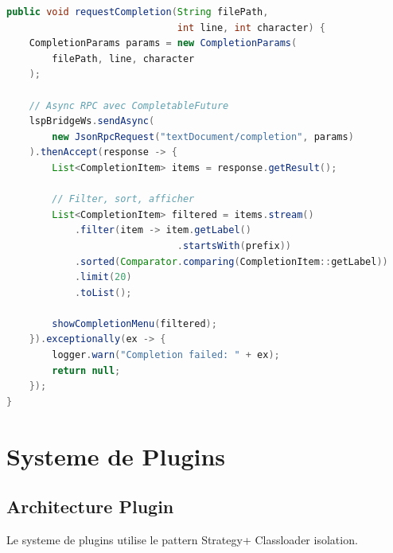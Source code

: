 \documentclass[11pt,a4paper,hidelinks]{book}
\begin{document}
\begin{lstlisting}[language=Java, caption={Completion Handler}]
public void requestCompletion(String filePath, 
                              int line, int character) {
    CompletionParams params = new CompletionParams(
        filePath, line, character
    );
    
    // Async RPC avec CompletableFuture
    lspBridgeWs.sendAsync(
        new JsonRpcRequest("textDocument/completion", params)
    ).thenAccept(response -> {
        List<CompletionItem> items = response.getResult();
        
        // Filter, sort, afficher
        List<CompletionItem> filtered = items.stream()
            .filter(item -> item.getLabel()
                              .startsWith(prefix))
            .sorted(Comparator.comparing(CompletionItem::getLabel))
            .limit(20)
            .toList();
        
        showCompletionMenu(filtered);
    }).exceptionally(ex -> {
        logger.warn("Completion failed: " + ex);
        return null;
    });
}
\end{lstlisting}

\section{Systeme de Plugins}

\subsection{Architecture Plugin}

Le systeme de plugins utilise le pattern Strategy+ Classloader isolation.
\end{document}
